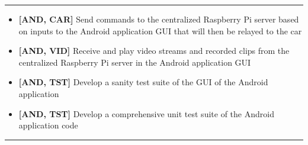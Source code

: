 \documentclass[letterpaper,12pt]{report}
\begin{document}
	\noindent\rule{\textwidth}{0.5pt}
	\begin{itemize}
		\item \textbf{[AND, CAR]} Send commands to the centralized Raspberry Pi server based on inputs to the Android application GUI that will then be relayed to the car
		\item \textbf{[AND, VID]} Receive and play video streams and recorded clips from the centralized Raspberry Pi server in the Android application GUI
		\item \textbf{[AND, TST]} Develop a sanity test suite of the GUI of the Android application
		\item \textbf{[AND, TST]} Develop a comprehensive unit test suite of the Android application code
	\end{itemize}
	\noindent\rule{\textwidth}{0.5pt}
\end{document}
